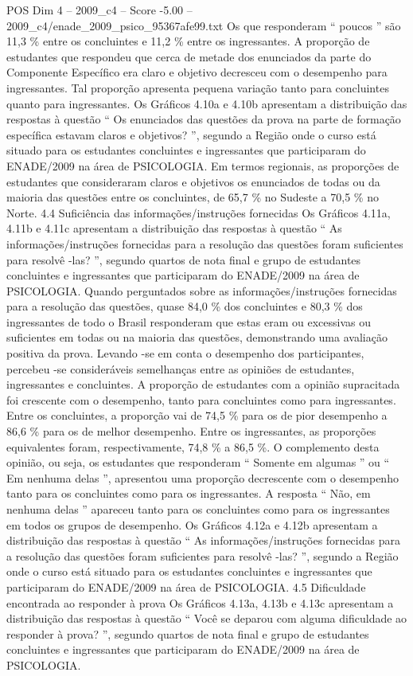 \begin{textsample}{POS Dim 4 – 2009\_c4 – Score -5.00 – 2009\_c4/enade\_2009\_psico\_95367afe99.txt}
Os que responderam “ poucos ” são 11,3 \% entre os concluintes e 11,2 \% entre os ingressantes.
A proporção de estudantes que respondeu que cerca de metade dos enunciados da parte do Componente Específico era claro e objetivo decresceu com o desempenho para ingressantes.
Tal proporção apresenta pequena variação tanto para concluintes quanto para ingressantes.
Os Gráficos 4.10a e 4.10b apresentam a distribuição das respostas à questão “ Os enunciados das questões da prova na parte de formação específica estavam claros e objetivos? ”, segundo a Região onde o curso está situado para os estudantes concluintes e ingressantes que participaram do ENADE/2009 na área de PSICOLOGIA.
Em termos regionais, as proporções de estudantes que consideraram claros e objetivos os enunciados de todas ou da maioria das questões entre os concluintes, de 65,7 \% no Sudeste a 70,5 \% no Norte. 4.4 Suficiência das informações/instruções fornecidas Os Gráficos 4.11a, 4.11b e 4.11c apresentam a distribuição das respostas à questão “ As informações/instruções fornecidas para a resolução das questões foram suficientes para resolvê -las? ”, segundo quartos de nota final e grupo de estudantes concluintes e ingressantes que participaram do ENADE/2009 na área de PSICOLOGIA.
Quando perguntados sobre as informações/instruções fornecidas para a resolução das questões, quase 84,0 \% dos concluintes e 80,3 \% dos ingressantes de todo o Brasil responderam que estas eram ou excessivas ou suficientes em todas ou na maioria das questões, demonstrando uma avaliação positiva da prova.
Levando -se em conta o desempenho dos participantes, percebeu -se consideráveis semelhanças entre as opiniões de estudantes, ingressantes e concluintes.
A proporção de estudantes com a opinião supracitada foi crescente com o desempenho, tanto para concluintes como para ingressantes.
Entre os concluintes, a proporção vai de 74,5 \% para os de pior desempenho a 86,6 \% para os de melhor desempenho.
Entre os ingressantes, as proporções equivalentes foram, respectivamente, 74,8 \% a 86,5 \%.
O complemento desta opinião, ou seja, os estudantes que responderam “ Somente em algumas ” ou “ Em nenhuma delas ”, apresentou uma proporção decrescente com o desempenho tanto para os concluintes como para os ingressantes.
A resposta “ Não, em nenhuma delas ” apareceu tanto para os concluintes como para os ingressantes em todos os grupos de desempenho.
Os Gráficos 4.12a e 4.12b apresentam a distribuição das respostas à questão “ As informações/instruções fornecidas para a resolução das questões foram suficientes para resolvê -las? ”, segundo a Região onde o curso está situado para os estudantes concluintes e ingressantes que participaram do ENADE/2009 na área de PSICOLOGIA. 4.5 Dificuldade encontrada ao responder à prova Os Gráficos 4.13a, 4.13b e 4.13c apresentam a distribuição das respostas à questão “ Você se deparou com alguma dificuldade ao responder à prova? ”, segundo quartos de nota final e grupo de estudantes concluintes e ingressantes que participaram do ENADE/2009 na área de PSICOLOGIA.

\end{textsample}
